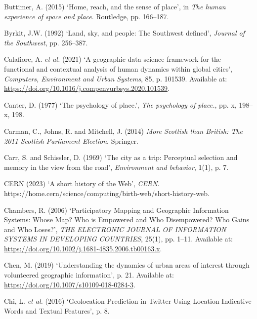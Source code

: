 \documentclass[
  letterpaper,
  11pt,
  english,
  onehalfspacing,
  headsepline]{MastersDoctoralThesis}
\newlength{\cslhangindent}
\newlength{\cslentryspacingunit} %
\newenvironment{CSLReferences}[2] %
 {%
  \setlength{\parindent}{0pt}
  \ifodd #1
  \let\oldpar\par
  \def\par{\hangindent=\cslhangindent\oldpar}
  \fi
  \setlength{\parskip}{#2\cslentryspacingunit}
 }%
 {}
\begin{document}
\begin{CSLReferences}{0}{0}
\leavevmode{}%
Buttimer, A. (2015) {`Home, reach, and the sense of place'}, in
\emph{The human experience of space and place}. {Routledge}, pp.
166--187.

\leavevmode{}%
Byrkit, J.W. (1992) {`Land, sky, and people: {The Southwest} defined'},
\emph{Journal of the Southwest}, pp. 256--387.

\leavevmode{}%
Calafiore, A. \emph{et al.} (2021) {`A geographic data science framework
for the functional and contextual analysis of human dynamics within
global cities'}, \emph{Computers, Environment and Urban Systems}, 85, p.
101539. Available at:
\url{https://doi.org/10.1016/j.compenvurbsys.2020.101539}.

\leavevmode{}%
Canter, D. (1977) {`The psychology of place.'}, \emph{The psychology of
place.}, pp. x, 198--x, 198.

\leavevmode{}%
Carman, C., Johns, R. and Mitchell, J. (2014) \emph{More {Scottish} than
{British}: {The} 2011 {Scottish Parliament Election}}. {Springer}.

\leavevmode{}%
Carr, S. and Schissler, D. (1969) {`The city as a trip: Perceptual
selection and memory in the view from the road'}, \emph{Environment and
behavior}, 1(1), p. 7.

\leavevmode{}%
CERN (2023) {`A short history of the {Web}'}, \emph{CERN}.
https://home.cern/science/computing/birth-web/short-history-web.

\leavevmode{}%
Chambers, R. (2006) {`Participatory {Mapping} and {Geographic
Information Systems}: {Whose Map}? {Who} is {Empowered} and {Who
Disempowered}? {Who Gains} and {Who Loses}?'}, \emph{THE ELECTRONIC
JOURNAL OF INFORMATION SYSTEMS IN DEVELOPING COUNTRIES}, 25(1), pp.
1--11. Available at:
\url{https://doi.org/10.1002/j.1681-4835.2006.tb00163.x}.

\leavevmode{}%
Chen, M. (2019) {`Understanding the dynamics of urban areas of interest
through volunteered geographic information'}, p. 21. Available at:
\url{https://doi.org/10.1007/s10109-018-0284-3}.

\leavevmode{}%
Chi, L. \emph{et al.} (2016) {`Geolocation {Prediction} in {Twitter
Using Location Indicative Words} and {Textual Features}'}, p. 8.


\end{CSLReferences}
\end{document}
